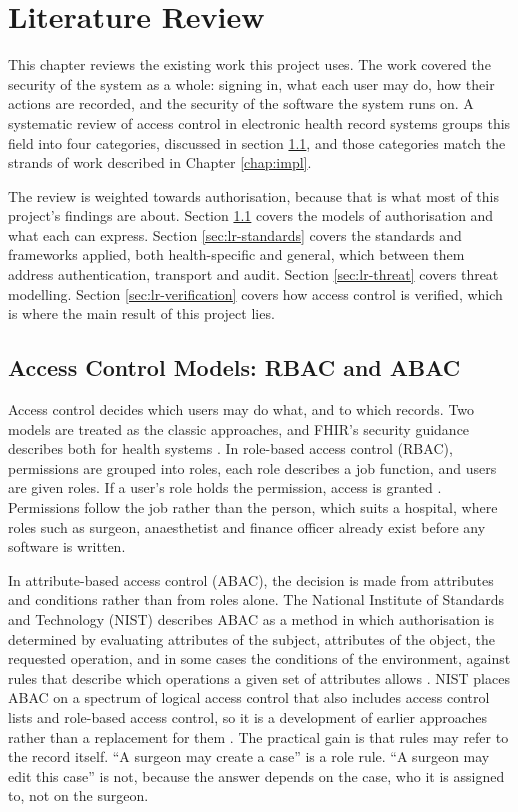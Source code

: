 \chapter{Literature Review}
\label{chap:lr}

This chapter reviews the existing work this project uses. The work covered the security of the system as a whole: signing in, what each user may do, how their actions are recorded, and the security of the software the system runs on. A systematic review of access control in electronic health record systems groups this field into four categories, discussed in section \ref{sec:lr-rbac-abac}, and those categories match the strands of work described in Chapter \ref{chap:impl}.

The review is weighted towards authorisation, because that is what most of this project's findings are about. Section \ref{sec:lr-rbac-abac} covers the models of authorisation and what each can express. Section \ref{sec:lr-standards} covers the standards and frameworks applied, both health-specific and general, which between them address authentication, transport and audit. Section \ref{sec:lr-threat} covers threat modelling. Section \ref{sec:lr-verification} covers how access control is verified, which is where the main result of this project lies.

\section{Access Control Models: RBAC and ABAC}
\label{sec:lr-rbac-abac}

Access control decides which users may do what, and to which records. Two models are treated as the classic approaches, and FHIR's security guidance describes both for health systems \cite{hl7fhir}. In role-based access control (RBAC), permissions are grouped into roles, each role describes a job function, and users are given roles. If a user's role holds the permission, access is granted \cite{hl7fhir}. Permissions follow the job rather than the person, which suits a hospital, where roles such as surgeon, anaesthetist and finance officer already exist before any software is written.

In attribute-based access control (ABAC), the decision is made from attributes and conditions rather than from roles alone. The National Institute of Standards and Technology (NIST) describes ABAC as a method in which authorisation is determined by evaluating attributes of the subject, attributes of the object, the requested operation, and in some cases the conditions of the environment, against rules that describe which operations a given set of attributes allows \cite{nist80162}. NIST places ABAC on a spectrum of logical access control that also includes access control lists and role-based access control, so it is a development of earlier approaches rather than a replacement for them \cite{nist80162}. The practical gain is that rules may refer to the record itself. ``A surgeon may create a case'' is a role rule. ``A surgeon may edit this case'' is not, because the answer depends on the case, who it is assigned to, not on the surgeon.

